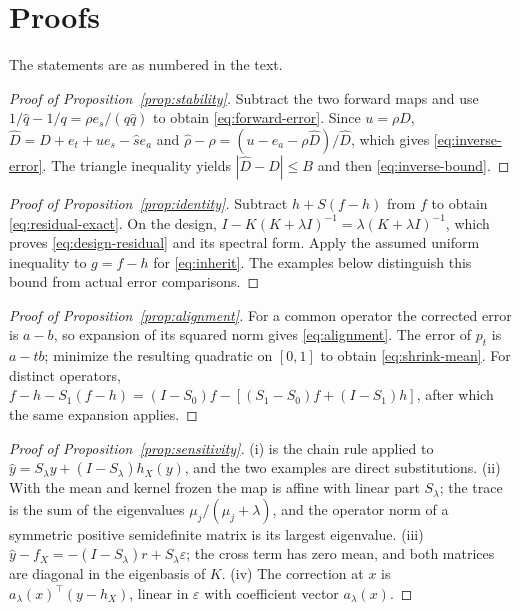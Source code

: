 \appendix
\section{Proofs}\label{app:proofs}

The statements are as numbered in the text.

\begin{proof}[Proof of Proposition~\ref{prop:stability}]
Subtract the two forward maps and use
$1/\widehat q-1/q=\rho e_s/(q\widehat q)$ to obtain
\eqref{eq:forward-error}. Since $u=\rho D$,
$\widehat D=D+e_t+u e_s-\widehat s e_a$ and
$\widehat\rho-\rho=(u-e_a-\rho\widehat D)/\widehat D$, which gives
\eqref{eq:inverse-error}. The triangle inequality yields
$|\widehat D-D|\le B$ and then \eqref{eq:inverse-bound}.
\end{proof}

\begin{proof}[Proof of Proposition~\ref{prop:identity}]
Subtract $h+S(f-h)$ from $f$ to obtain \eqref{eq:residual-exact}. On the design,
$I-K(K+\lambda I)^{-1}=\lambda(K+\lambda I)^{-1}$, which proves
\eqref{eq:design-residual} and its spectral form. Apply the assumed uniform inequality to
$g=f-h$ for \eqref{eq:inherit}. The examples below distinguish this bound from actual error comparisons.
\end{proof}

\begin{proof}[Proof of Proposition~\ref{prop:alignment}]
For a common operator the corrected error is $a-b$, so expansion of its squared norm gives
\eqref{eq:alignment}. The error of $p_t$ is $a-tb$; minimize the resulting quadratic on
$[0,1]$ to obtain \eqref{eq:shrink-mean}. For distinct operators,
$f-h-S_1(f-h)=(I-S_0)f-[(S_1-S_0)f+(I-S_1)h]$, after which the same expansion applies.
\end{proof}

\begin{proof}[Proof of Proposition~\ref{prop:sensitivity}]
(i) is the chain rule applied to $\widehat y=S_\lambda y+(I-S_\lambda)h_X(y)$, and the two examples are direct
substitutions. (ii) With the mean and kernel frozen the map is affine with linear part $S_\lambda$; the trace is the
sum of the eigenvalues $\mu_j/(\mu_j+\lambda)$, and the operator norm of a symmetric positive semidefinite matrix is
its largest eigenvalue. (iii) $\widehat y-f_X=-(I-S_\lambda)r+S_\lambda\varepsilon$; the cross term has zero mean,
and both matrices are diagonal in the eigenbasis of $K$. (iv) The correction at $x$ is $a_\lambda(x)^{\top}(y-h_X)$,
linear in $\varepsilon$ with coefficient vector $a_\lambda(x)$.
\end{proof}

